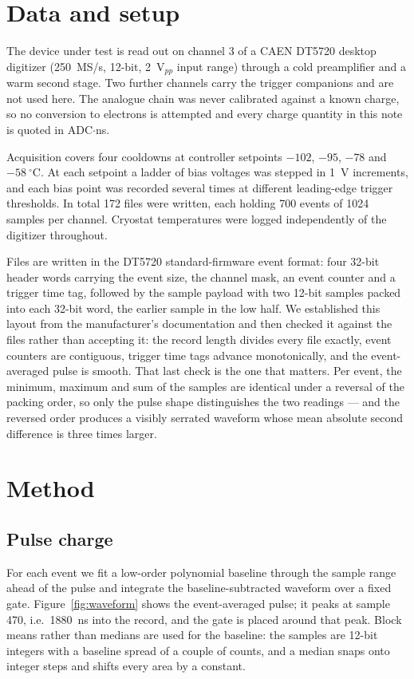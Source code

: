 \documentclass[10pt,twocolumn]{article}
\begin{document}
\section{Data and setup}

The device under test is read out on channel 3 of a CAEN DT5720 desktop
digitizer (250~MS/s, 12-bit, 2~V$_{pp}$ input range) through a
cold preamplifier and a warm second stage. Two further channels carry the
trigger companions and are not used here. The analogue chain was never
calibrated against a known charge, so no conversion to electrons is attempted
and every charge quantity in this note is quoted in ADC$\cdot$ns.

Acquisition covers four cooldowns at controller setpoints $-102$, $-95$, $-78$
and $-58~^\circ$C. At each setpoint a ladder of bias voltages was stepped in
1~V increments, and each bias point was recorded several times at
different leading-edge trigger thresholds. In total 172 files were written,
each holding 700 events of 1024 samples per channel. Cryostat temperatures were
logged independently of the digitizer throughout.

Files are written in the DT5720 standard-firmware event format: four 32-bit
header words carrying the event size, the channel mask, an event counter and a
trigger time tag, followed by the sample payload with two 12-bit samples packed
into each 32-bit word, the earlier sample in the low half. We established this
layout from the manufacturer's documentation and then checked it against the
files rather than accepting it: the record length divides every file exactly,
event counters are contiguous, trigger time tags advance monotonically, and the
event-averaged pulse is smooth. That last check is the one that matters. Per
event, the minimum, maximum and sum of the samples are identical under a
reversal of the packing order, so only the pulse shape distinguishes the two
readings --- and the reversed order produces a visibly serrated waveform whose
mean absolute second difference is three times larger.

\section{Method}

\subsection{Pulse charge}

For each event we fit a low-order polynomial baseline through the sample range
ahead of the pulse and integrate the baseline-subtracted waveform over a fixed
gate. Figure~\ref{fig:waveform} shows the event-averaged pulse; it peaks at
sample 470, i.e.\ 1880~ns into the record, and the gate is
placed around that peak. Block means rather than medians are used for the
baseline: the samples are 12-bit integers with a baseline spread of a couple of
counts, and a median snaps onto integer steps and shifts every area by a
constant.
\end{document}
